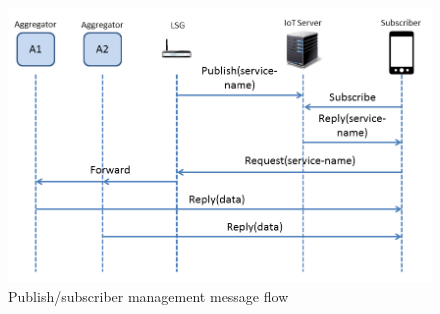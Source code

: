 \begin{figure}
\includegraphics[width=\columnwidth]{figure/pub_sub.png}
\caption{\label{fig:pubsub}Publish/subscriber management message flow}
\end{figure}

